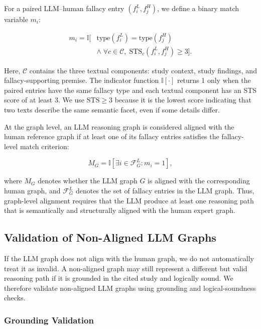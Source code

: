 \documentclass[11pt]{article}
\begin{document}
For a paired LLM--human fallacy entry $(f_i^{L}, f_j^{H})$, we define a binary match variable $m_i$:

\begin{equation}
\begin{aligned}
m_i =
\mathbb{I}\big[
&\mathrm{type}(f_i^{L}) = \mathrm{type}(f_j^{H}) \\
&\land\; \forall c \in \mathcal{C},\;
\mathrm{STS}_c(f_i^{L}, f_j^{H}) \geq 3
\big].
\end{aligned}
\end{equation}

\noindent
Here, $\mathcal{C}$ contains the three textual components: study context, study findings, and fallacy-supporting premise. 
The indicator function $\mathbb{I}[\cdot]$ returns 1 only when the paired entries have the same fallacy type and each textual component has an STS score of at least 3. 
We use $\mathrm{STS}\geq3$ because it is the lowest score indicating that two texts describe the same semantic facet, even if some details differ.

At the graph level, an LLM reasoning graph is considered aligned with the human reference graph if at least one of its fallacy entries satisfies the fallacy-level match criterion:

\begin{equation}
M_G =
\mathbb{I}\left[
\exists i \in \mathcal{F}_{G}^{L} : m_i = 1
\right],
\end{equation}

\noindent
where $M_G$ denotes whether the LLM graph $G$ is aligned with the corresponding human graph, and $\mathcal{F}_{G}^{L}$ denotes the set of fallacy entries in the LLM graph. 
Thus, graph-level alignment requires that the LLM produce at least one reasoning path that is semantically and structurally aligned with the human expert graph.

\subsection{Validation of Non-Aligned LLM Graphs}
\label{subsec:validation}

If the LLM graph does not align with the human graph, we do not automatically treat it as invalid. 
A non-aligned graph may still represent a different but valid reasoning path if it is grounded in the cited study and logically sound. 
We therefore validate non-aligned LLM graphs using grounding and logical-soundness checks.

\subsubsection{Grounding Validation}
\label{subsubsec:grounding}
\end{document}
